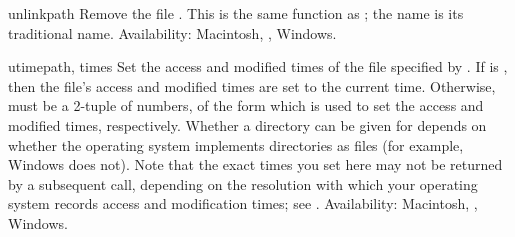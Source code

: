 \begin{funcdesc}{unlink}{path}
Remove the file .  This is the same function as
; the  name is its traditional
\UNIX{} name.
Availability: Macintosh, \UNIX, Windows.
\end{funcdesc}

\begin{funcdesc}{utime}{path, times}
Set the access and modified times of the file specified by .
If  is , then the file's access and modified
times are set to the current time.  Otherwise,  must be a
2-tuple of numbers, of the form 
which is used to set the access and modified times, respectively.
Whether a directory can be given for  depends on whether the
operating system implements directories as files (for example, Windows
does not).  Note that the exact times you set here may not be returned
by a subsequent  call, depending on the resolution
with which your operating system records access and modification times;
see .
Availability: Macintosh, \UNIX, Windows.
\end{funcdesc}

